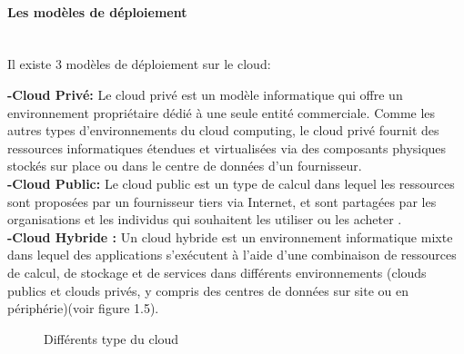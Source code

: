 \paragraph{\selectfont\Large Les modèles de déploiement }
\texttt{}\\[0.2cm]
Il existe 3 modèles de déploiement sur le cloud:

\par \noindent \textbf{\Large -Cloud Privé:  } Le cloud privé est un modèle informatique qui offre un environnement propriétaire dédié à une seule entité commerciale. Comme les autres types d'environnements du cloud computing, le cloud privé fournit des ressources informatiques étendues et virtualisées via des composants physiques stockés sur place ou dans le centre de données d'un fournisseur\cite{6}.\\[0.1cm]

\noindent \textbf{\Large -Cloud Public: } Le cloud public est un type de calcul dans lequel les ressources sont proposées par un fournisseur tiers via Internet, et sont partagées par les organisations et les individus qui souhaitent les utiliser ou les acheter \cite{7}.\\[0.1cm]

\noindent \textbf{\Large -Cloud Hybride :  } Un cloud hybride est un environnement informatique mixte dans lequel des applications s'exécutent à l'aide d'une combinaison de ressources de calcul, de stockage et de services dans différents environnements (clouds publics et clouds privés, y compris des centres de données sur site ou en périphérie)\cite{8}(voir figure 1.5).\\[0.1cm]

\begin{figure}[H]
    \begin{center}
    \end{center}

    \caption{ Différents type du cloud}
\end{figure}

